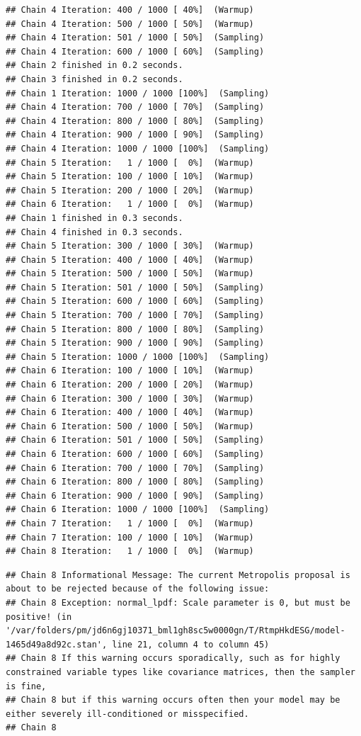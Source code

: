 \documentclass[
]{article}
\begin{document}
\begin{verbatim}
## Chain 4 Iteration: 400 / 1000 [ 40%]  (Warmup) 
## Chain 4 Iteration: 500 / 1000 [ 50%]  (Warmup) 
## Chain 4 Iteration: 501 / 1000 [ 50%]  (Sampling) 
## Chain 4 Iteration: 600 / 1000 [ 60%]  (Sampling) 
## Chain 2 finished in 0.2 seconds.
## Chain 3 finished in 0.2 seconds.
## Chain 1 Iteration: 1000 / 1000 [100%]  (Sampling) 
## Chain 4 Iteration: 700 / 1000 [ 70%]  (Sampling) 
## Chain 4 Iteration: 800 / 1000 [ 80%]  (Sampling) 
## Chain 4 Iteration: 900 / 1000 [ 90%]  (Sampling) 
## Chain 4 Iteration: 1000 / 1000 [100%]  (Sampling) 
## Chain 5 Iteration:   1 / 1000 [  0%]  (Warmup) 
## Chain 5 Iteration: 100 / 1000 [ 10%]  (Warmup) 
## Chain 5 Iteration: 200 / 1000 [ 20%]  (Warmup) 
## Chain 6 Iteration:   1 / 1000 [  0%]  (Warmup) 
## Chain 1 finished in 0.3 seconds.
## Chain 4 finished in 0.3 seconds.
## Chain 5 Iteration: 300 / 1000 [ 30%]  (Warmup) 
## Chain 5 Iteration: 400 / 1000 [ 40%]  (Warmup) 
## Chain 5 Iteration: 500 / 1000 [ 50%]  (Warmup) 
## Chain 5 Iteration: 501 / 1000 [ 50%]  (Sampling) 
## Chain 5 Iteration: 600 / 1000 [ 60%]  (Sampling) 
## Chain 5 Iteration: 700 / 1000 [ 70%]  (Sampling) 
## Chain 5 Iteration: 800 / 1000 [ 80%]  (Sampling) 
## Chain 5 Iteration: 900 / 1000 [ 90%]  (Sampling) 
## Chain 5 Iteration: 1000 / 1000 [100%]  (Sampling) 
## Chain 6 Iteration: 100 / 1000 [ 10%]  (Warmup) 
## Chain 6 Iteration: 200 / 1000 [ 20%]  (Warmup) 
## Chain 6 Iteration: 300 / 1000 [ 30%]  (Warmup) 
## Chain 6 Iteration: 400 / 1000 [ 40%]  (Warmup) 
## Chain 6 Iteration: 500 / 1000 [ 50%]  (Warmup) 
## Chain 6 Iteration: 501 / 1000 [ 50%]  (Sampling) 
## Chain 6 Iteration: 600 / 1000 [ 60%]  (Sampling) 
## Chain 6 Iteration: 700 / 1000 [ 70%]  (Sampling) 
## Chain 6 Iteration: 800 / 1000 [ 80%]  (Sampling) 
## Chain 6 Iteration: 900 / 1000 [ 90%]  (Sampling) 
## Chain 6 Iteration: 1000 / 1000 [100%]  (Sampling) 
## Chain 7 Iteration:   1 / 1000 [  0%]  (Warmup) 
## Chain 7 Iteration: 100 / 1000 [ 10%]  (Warmup) 
## Chain 8 Iteration:   1 / 1000 [  0%]  (Warmup)
\end{verbatim}

\begin{verbatim}
## Chain 8 Informational Message: The current Metropolis proposal is about to be rejected because of the following issue:
## Chain 8 Exception: normal_lpdf: Scale parameter is 0, but must be positive! (in '/var/folders/pm/jd6n6gj10371_bml1gh8sc5w0000gn/T/RtmpHkdESG/model-1465d49a8d92c.stan', line 21, column 4 to column 45)
## Chain 8 If this warning occurs sporadically, such as for highly constrained variable types like covariance matrices, then the sampler is fine,
## Chain 8 but if this warning occurs often then your model may be either severely ill-conditioned or misspecified.
## Chain 8
\end{verbatim}
\end{document}
